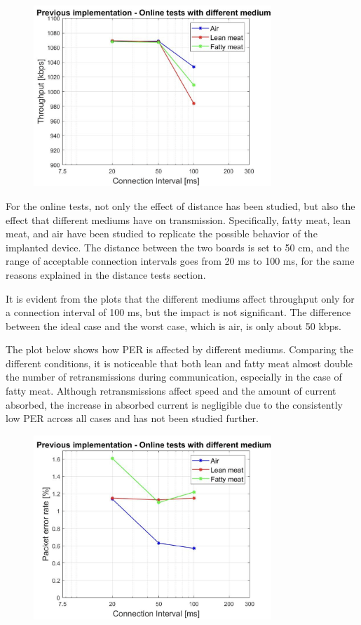\documentclass{Configuration_Files/PoliMi3i_thesis}
\begin{document}
\begin{figure}[H]
    \centering
    \includegraphics[width=0.8\textwidth]{Results Manuel/figure7}
    \label{fig:figure1}
\end{figure}

For the online tests, not only the effect of distance has been studied, but also the effect that different mediums have on transmission. Specifically, fatty meat, lean meat, and air have been studied to replicate the possible behavior of the implanted device. The distance between the two boards is set to 50 cm, and the range of acceptable connection intervals goes from 20 ms to 100 ms, for the same reasons explained in the distance tests section.

It is evident from the plots that the different mediums affect throughput only for a connection interval of 100 ms, but the impact is not significant. The difference between the ideal case and the worst case, which is air, is only about 50 kbps.

The plot below shows how PER is affected by different mediums. Comparing the different conditions, it is noticeable that both lean and fatty meat almost double the number of retransmissions during communication, especially in the case of fatty meat. Although retransmissions affect speed and the amount of current absorbed, the increase in absorbed current is negligible due to the consistently low PER across all cases and has not been studied further.

\begin{figure}[H]
    \centering
    \includegraphics[width=0.8\textwidth]{Results Manuel/figure8}
    \label{fig:figure1}
\end{figure}
\end{document}
